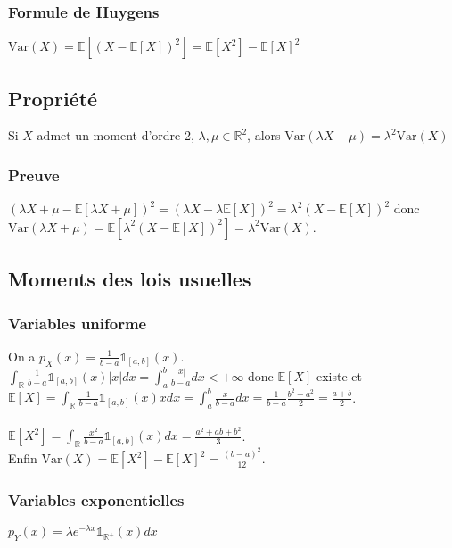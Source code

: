 \documentclass[a4paper,10pt]{book} %
\newcommand{\R}{\mathbb{R}}
\newcommand{\E}{\mathbb{E}} %
\newcommand\abs[1]{\left|#1\right|}
\newcommand{\indi}{\mathds{1}} %
\newcommand{\Var}{\mathrm{Var}} %
\begin{document}
\subsubsection{Formule de Huygens}
$\Var(X) =\E[(X-\E[X])^2] = \E[X^2]-\E[X]^2$

\subsection{Propriété}
Si $X$ admet un moment d'ordre 2, $\lambda,\mu\in \R^2$, alors $\Var(\lambda X + \mu) =\lambda^2\Var(X)$

\subsubsection{Preuve}
$(\lambda X+\mu - \E[\lambda X + \mu])^2 = (\lambda X - \lambda \E[X])^2  = \lambda^2(X-\E[X])^2$ donc\\$\Var(\lambda X +\mu)= \E[\lambda^2 (X- \E[X])^2] = \lambda^2\Var(X)$.

\newpage

\subsection{Moments des lois usuelles}
\subsubsection{Variables uniforme}
On a $\displaystyle p_X(x) = \frac{1}{b-a}\indi_{[a,b]}(x)$.\\

$\displaystyle \int_\R \frac{1}{b-a}\indi_{[a,b]}(x)\abs{x}dx = \int_a^b \frac{\abs{x}}{b-a}dx < +\infty$ donc $\E[X]$ existe et\\
$\displaystyle \E[X] = \int_\R \frac{1}{b-a}\indi_{[a,b]}(x)xdx = \int_a^b \frac{x}{b-a}dx = \frac{1}{b-a}\frac{b^2-a^2}{2} = \frac{a+b}{2}$.\\\\

$\displaystyle \E[X^2] = \int_\R \frac{x^2}{b-a} \indi_{[a,b]}(x)dx = \frac{a^2 + ab + b^2}{3}$.\\

Enfin $\Var(X) = \E[X^2] - \E[X]^2 = \frac{(b-a)^2}{12}$.

\subsubsection{Variables exponentielles}
$p_Y(x) = \lambda e^{-\lambda x}\indi_{\R^+}(x)dx$\\
\end{document}
